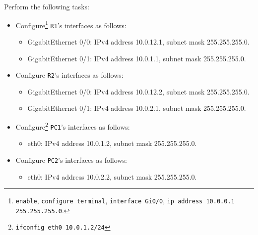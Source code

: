 \documentclass[pdftex,12pt,a4paper]{article}
\begin{document}
            Perform the following tasks:
            \begin{itemize}
                \item Configure\footnote{\texttt{enable}, \texttt{configure
                    terminal}, \texttt{interface Gi0/0}, \texttt{ip address
                    10.0.0.1 255.255.255.0}.} \texttt{R1}'s interfaces as follows:
                    \begin{itemize}
                        \item GigabitEthernet 0/0: IPv4 address 10.0.12.1,
                            subnet mask 255.255.255.0.
                        \item GigabitEthernet 0/1: IPv4 address 10.0.1.1,
                            subnet mask 255.255.255.0.
                    \end{itemize}
                \item Configure \texttt{R2}'s interfaces as follows:
                    \begin{itemize}
                        \item GigabitEthernet 0/0: IPv4 address 10.0.12.2,
                            subnet mask 255.255.255.0.
                        \item GigabitEthernet 0/1: IPv4 address 10.0.2.1,
                            subnet mask 255.255.255.0.
                    \end{itemize}
                \item Configure\footnote{\texttt{ifconfig eth0 10.0.1.2/24}}
                    \texttt{\texttt{PC1}}'s interfaces as follows:
                    \begin{itemize}
                        \item eth0: IPv4 address 10.0.1.2,
                            subnet mask 255.255.255.0.
                    \end{itemize}
                \item Configure \texttt{\texttt{PC2}}'s interfaces as follows:
                    \begin{itemize}
                        \item eth0: IPv4 address 10.0.2.2,
                            subnet mask 255.255.255.0.
                    \end{itemize}
            \end{itemize}
\end{document}
